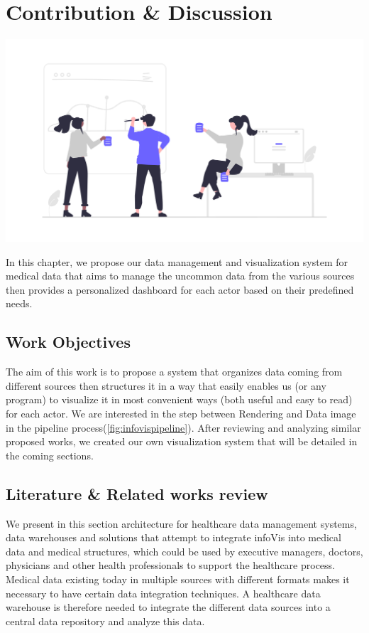 \chapter{Contribution \& Discussion}

		




\label{chapitre4}
		
		\includegraphics [width=1 \linewidth, height=0.8\textheight, keepaspectratio] {images/chaptersFigures/contribution.png}
		
	
		
    \newpage
    \thispagestyle{plain}

In this chapter, we propose our data management and visualization system for medical data that aims to manage the uncommon data from the various sources then provides a personalized dashboard for each actor based on their predefined needs.




\section{Work Objectives}
The aim of this work is to propose a system that organizes data coming from different sources then structures it in a way that easily enables us (or any program) to visualize it in most convenient ways (both useful and easy to read) for each actor. We are interested in the step between Rendering and Data image in the pipeline process(\ref{fig:infovispipeline}). After reviewing and analyzing similar proposed works, we created our own visualization system that will be detailed in the coming sections.



\section{Literature \& Related works review}
We present in this section architecture for healthcare data management systems, data warehouses and solutions that attempt to integrate infoVis into medical data and medical structures, which could be used by executive managers, doctors, physicians and other health professionals to support the healthcare process.  Medical data existing today in multiple sources with different formats makes it necessary to have certain data integration techniques. A healthcare data warehouse is therefore needed to integrate the different data sources into a central data repository and analyze this data.
\bigbreak

